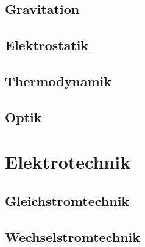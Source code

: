 \documentclass[a5paper]{report}
\begin{document}
		\chapter{Gravitation}
		

		\chapter{Elektrostatik}
		

		\chapter{Thermodynamik}
		

		\chapter{Optik}
		

	\part{Elektrotechnik}

		\chapter{Gleichstromtechnik}
		

		\chapter{Wechselstromtechnik}
		

%
%
\end{document}
